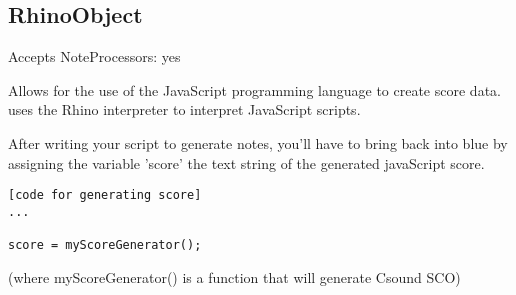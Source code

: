 \subsection{RhinoObject}\label{rhinoObject}

Accepts NoteProcessors: yes

Allows for the use of the JavaScript programming language to create
score data. uses the Rhino interpreter to interpret JavaScript scripts.

After writing your script to generate notes, you'll have to bring back
into blue by assigning the variable 'score' the text string of the
generated javaScript score.

\begin{verbatim}
[code for generating score]
...
         
score = myScoreGenerator();
\end{verbatim}

(where myScoreGenerator() is a function that will generate Csound SCO)
